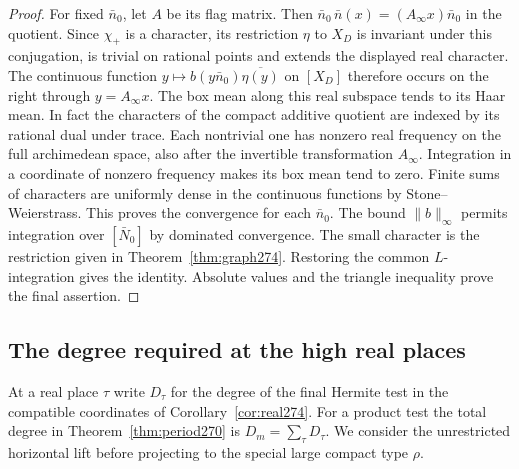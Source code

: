 \documentclass[a4paper,11pt]{article}
\theoremstyle{definition}
\theoremstyle{remark}
\numberwithin{equation}{section}
\begin{document}
\begin{proof}
For fixed \(\bar n_0\), let \(A\) be its flag matrix. Then
\(\bar n_0\,\bar n(x)=(A_\infty x)\bar n_0\) in the quotient.
Since \(\chi_+\) is a character, its restriction \(\eta\)
to \(X_D\) is invariant under this conjugation, is trivial
on rational points and extends the displayed real character.
The continuous function
\(y\mapsto b(y\bar n_0)\overline{\eta(y)}\) on \([X_D]\)
therefore occurs on the right through \(y=A_\infty x\).
The box mean along this real subspace tends to its Haar
mean. In fact the characters of the compact additive
quotient are indexed by its rational dual under trace.
Each nontrivial one has nonzero real frequency on the full
archimedean space, also after the invertible transformation
\(A_\infty\). Integration in a coordinate of nonzero frequency
makes its box mean tend to zero. Finite sums of characters
are uniformly dense in the continuous functions by
Stone--Weierstrass. This proves the convergence for each
\(\bar n_0\). The bound \(\|b\|_\infty\) permits integration
over \([\bar N_0]\) by dominated convergence. The small
character is the restriction given in Theorem~\ref{thm:graph274}.
Restoring the common \(L\)-integration gives the identity.
Absolute values and the triangle inequality prove the final
assertion.
\end{proof}

\subsection{The degree required at the high real places}\label{nav:IX-46}
At a real place \(\tau\) write \(D_\tau\) for the degree of
the final Hermite test in the compatible coordinates of
Corollary~\ref{cor:real274}. For a product test the total
degree in Theorem~\ref{thm:period270} is
\(D_m=\sum_\tau D_\tau\). We consider the unrestricted
horizontal lift before projecting to the special large
compact type \(\rho\).
\end{document}
